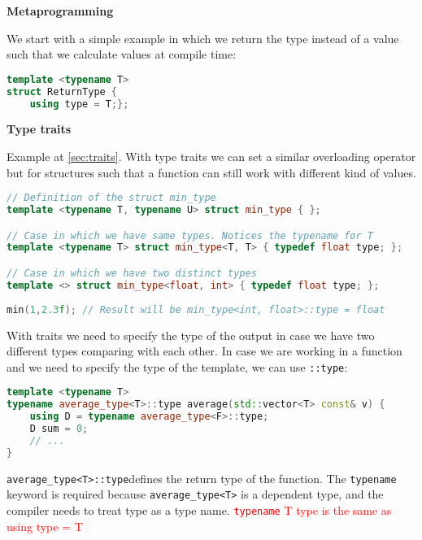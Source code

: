 \documentclass[fontsize=8pt, a4paper, landscape, fleqn]{scrartcl}
\renewcommand{\subsection}[1]{%
    \noindent\colorbox{subsectioncolor}{%
        \parbox{\dimexpr\columnwidth-2\fboxsep}{\color{white}\textbf{#1}}}%
    \vspace{0.5mm}%
}
\begin{document}
\begin{multicols*}{3}[\raggedcolumns]
    \subsection{Metaprogramming}
    We start with a simple example in which we return the type instead of a value such that we calculate values at compile time:

    \begin{lstlisting}[language=C++, breaklines, emph={using}, emphstyle={\color{red}}]   
template <typename T>
struct ReturnType {
    using type = T;}; \end{lstlisting}

    \subsection{Type traits} 
    Example at \colorbox{orange!7}{\autoref{sec:traits}}.
    With type traits we can set a similar overloading operator but for structures such that a function can still work with different kind of values.
    
    \begin{lstlisting}[language=C++, breaklines, emph={typedef}, emphstyle={\color{red}}]   
// Definition of the struct min_type
template <typename T, typename U> struct min_type { };

// Case in which we have same types. Notices the typename for T
template <typename T> struct min_type<T, T> { typedef float type; };

// Case in which we have two distinct types
template <> struct min_type<float, int> { typedef float type; };
 
min(1,2.3f); // Result will be min_type<int, float>::type = float \end{lstlisting}
    
    With traits we need to specify the type of the output in case we have two different types comparing with each other. In case we are working in a function and we need to specify the type of the template, we can use \lstinline{::type}:

    \begin{lstlisting}[language=C++, breaklines, emph={using, T,type}, emphstyle={\color{red}}]   
template <typename T>
typename average_type<T>::type average(std::vector<T> const& v) {
    using D = typename average_type<F>::type;
    D sum = 0;
    // ...
} \end{lstlisting}
\lstinline{average_type<T>::type}defines the return type of the function. The \lstinline{typename} keyword is required because \lstinline{average_type<T>} is a dependent type, and the compiler needs to treat type as a type name.
\textcolor{red}{\lstinline{typename} T type is the same as using type = T}

\end{multicols*}
\end{document}
